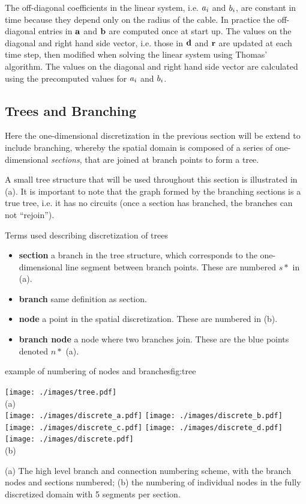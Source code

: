 The off-diagonal coefficients in the linear system, i.e. ${a}_{i}$ and ${b}_{i}$,  are constant in time because they depend only on the radius of the cable. In practice the off-diagonal entries in $\mathbf{a}$ and $\mathbf{b}$ are computed once at start up. The values on the diagonal and right hand side vector, i.e. those in $\mathbf{d}$ and $\mathbf{r}$ are updated at each time step, then modified when solving the linear system using Thomas' algorithm. The values on the diagonal and right hand side vector are calculated using the precomputed values for ${a}_{i}$ and ${b}_{i}$.
\subsection{Trees and Branching}
Here the one-dimensional discretization in the previous section will be extend to include branching, whereby the spatial domain is composed of a series of one-dimensional \emph{sections}, that are joined at branch points to form a tree.

A small tree structure that will be used throughout this section is illustrated in (a). It is important to note that the graph formed by the branching sections is a true tree, i.e. it has no circuits (once a section has branched, the branches can not ``rejoin'').

\begin{infobox}{Terms used describing discretization of trees}
\begin{itemize}[leftmargin=*]
    \item \textbf{section} a branch in the tree structure, which corresponds to the one-dimensional line segment between branch points. These are numbered $s*$ in (a).
    \item \textbf{branch} same definition as section.
    \item \textbf{node} a point in the spatial discretization. These are numbered in (b).
    \item \textbf{branch node} a node where two branches join. These are the blue points denoted $n*$ (a).
\end{itemize}
\end{infobox}

\begin{myfigure}{example of numbering of nodes and branches}{fig:tree}
\begin{center}
\texttt{[image: ./images/tree.pdf]}
\\{\normalsize (a)}\\
\texttt{[image: ./images/discrete\_a.pdf]}
\texttt{[image: ./images/discrete\_b.pdf]}
\texttt{[image: ./images/discrete\_c.pdf]}
\texttt{[image: ./images/discrete\_d.pdf]}
\texttt{[image: ./images/discrete.pdf]}
\\{\normalsize (b)}
\end{center}
(a) The high level branch and connection numbering scheme, with the branch nodes and sections numbered; (b) the numbering of individual nodes in the fully discretized domain with 5 segments per section.
\end{myfigure}

